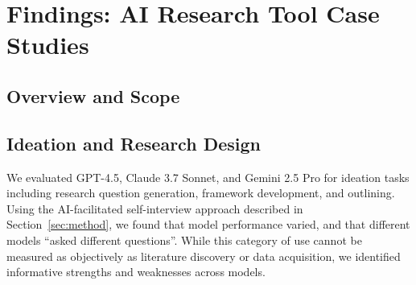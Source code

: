 %

\section{Findings: AI Research Tool Case Studies}


\subsection{Overview and Scope}



\subsection{Ideation and Research Design}

We evaluated GPT-4.5, Claude 3.7 Sonnet, and Gemini 2.5 Pro for ideation tasks including research question generation, framework development, and outlining. Using the AI-facilitated self-interview approach described in Section~\ref{sec:method}, we found that model performance varied, and that different models ``asked different questions''. While this category of use cannot be measured as objectively as literature discovery or data acquisition, we identified informative strengths and weaknesses across models.

